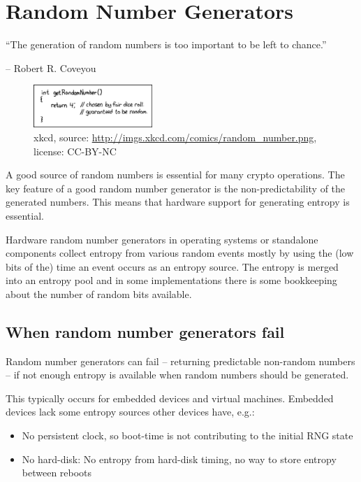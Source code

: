 \section{Random Number Generators}
\label{section:RNGs}


\epigraph{``The generation of random numbers is too important to be left to chance.''}{-- Robert R. Coveyou}


\begin{figure}[h]
  \centering
  \includegraphics[width=0.4\textwidth]{img/random_number.png}
  \caption{xkcd, source: \url{http://imgs.xkcd.com/comics/random_number.png}, license: CC-BY-NC}
  \label{fig:dilbertRNG}
\end{figure}



A good source of random numbers is essential for many crypto
operations. The key feature of a good random number generator is the
non-predictability of the generated numbers. This means that hardware
support for generating entropy is essential.


Hardware random number generators in operating systems or standalone
components collect entropy from various random events mostly by using
the (low bits of the) time an event occurs as an entropy source. The
entropy is merged into an entropy pool and in some implementations there
is some bookkeeping about the number of random bits available.

\subsection{When random number generators fail}

Random number generators can fail -- returning predictable non-random
numbers -- if not enough entropy is available when random numbers should
be generated.

This typically occurs for embedded devices and virtual machines.
Embedded devices lack some entropy sources other devices have, e.g.:

\begin{itemize}
\item No persistent clock, so boot-time is not contributing to the
    initial RNG state
\item No hard-disk: No entropy from hard-disk timing, no way to store
    entropy between reboots
\end{itemize}

